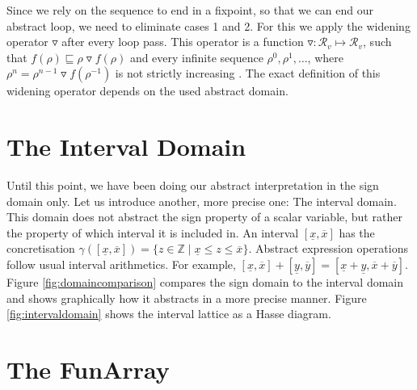 \begin{enumerate}
\begin{center}
\end{center}
\end{enumerate} 

\noindent Since we rely on the sequence to end in a fixpoint, so that we can end our abstract loop, we need to eliminate cases 1 and 2. For this we apply the widening operator $\triangledown$ after every loop pass. This operator is a function $\triangledown: \mathcal{R}_v\mapsto \mathcal{R}_v$, such that $f(\rho)\sqsubseteq\rho\triangledown f(\rho)$ and every infinite sequence $\rho^0,\rho^1,\dots$, where $\rho^n=\rho^{n-1}\triangledown f(\rho^{-1})$ is not strictly increasing \cite{cousot1977}. The exact definition of this widening operator depends on the used abstract domain.

\section{The Interval Domain}





Until this point, we have been doing our abstract interpretation in the sign domain only. Let us introduce another, more precise one: The interval domain. This domain does not abstract the sign property of a scalar variable, but rather the property of which interval it is included in. An interval $[\underline{x},\overline{x}]$ has the concretisation $\gamma([\underline{x},\overline{x}])=\{z\in\mathbb{Z} \;|\; \underline{x}\leq z \leq \overline{x}\}$. Abstract expression operations follow usual interval arithmetics. For example, $[\underline{x},\overline{x}]+[\underline{y},\overline{y}]=[\underline{x}+\underline{y},\overline{x}+\overline{y}]$. Figure \ref{fig:domaincomparison} compares the sign domain to the interval domain and shows graphically how it abstracts in a more precise manner. Figure \ref{fig:intervaldomain} shows the interval lattice as a Hasse diagram.

\clearpage \section{The FunArray}

